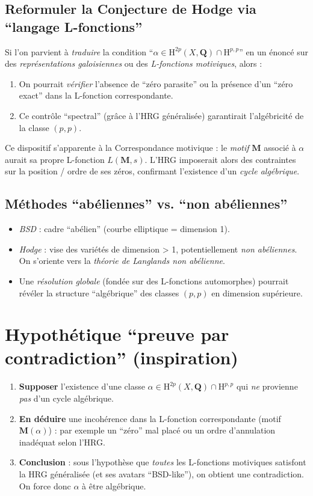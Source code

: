 \documentclass[11pt]{article}
\begin{document}
\subsection{Reformuler la Conjecture de Hodge via “langage L-fonctions”}

Si l'on parvient à \emph{traduire} la condition “\(\alpha \in \mathrm{H}^{2p}(X,\mathbf{Q}) \cap \mathrm{H}^{p,p}\)” en un énoncé sur des \emph{représentations galoisiennes} ou des \emph{L-fonctions motiviques}, alors :
\begin{enumerate}
  \item On pourrait \emph{vérifier} l'absence de “zéro parasite” ou la présence d'un “zéro exact” dans la L-fonction correspondante.
  \item Ce contrôle “spectral” (grâce à l'HRG généralisée) garantirait l'algébricité de la classe \((p,p)\).
\end{enumerate}
Ce dispositif s'apparente à la Correspondance motivique : le \emph{motif} $\mathbf{M}$ associé à $\alpha$ aurait sa propre L-fonction $L(\mathbf{M},s)$. L'HRG imposerait alors des contraintes sur la position / ordre de ses zéros, confirmant l'existence d'un \emph{cycle algébrique}.

\subsection{Méthodes “abéliennes” vs. “non abéliennes”}

\begin{itemize}
  \item \emph{BSD} : cadre “abélien” (courbe elliptique = dimension 1). 
  \item \emph{Hodge} : vise des variétés de dimension > 1, potentiellement \emph{non abéliennes}. On s'oriente vers la \emph{théorie de Langlands non abélienne}.
  \item Une \emph{résolution globale} (fondée sur des L-fonctions automorphes) pourrait révéler la structure “algébrique” des classes \((p,p)\) en dimension supérieure.
\end{itemize}

\section{Hypothétique “preuve par contradiction” (inspiration)}

\begin{enumerate}
  \item \textbf{Supposer} l'existence d'une classe \(\alpha\in \mathrm{H}^{2p}(X,\mathbf{Q})\cap \mathrm{H}^{p,p}\) qui \emph{ne} provienne \emph{pas} d'un cycle algébrique.
  \item \textbf{En déduire} une incohérence dans la L-fonction correspondante (motif $\mathbf{M}(\alpha)$) : par exemple un “zéro” mal placé ou un ordre d'annulation inadéquat selon l'HRG.
  \item \textbf{Conclusion} : sous l'hypothèse que \emph{toutes} les L-fonctions motiviques satisfont la HRG généralisée (et ses avatars “BSD-like”), on obtient une contradiction. On force donc \(\alpha\) à être algébrique.
\end{enumerate}
\end{document}
